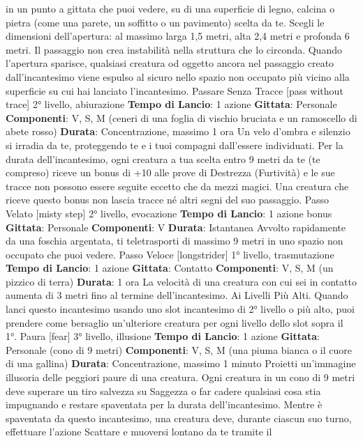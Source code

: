 \begin{multicols}{2}
in un punto a gittata che puoi vedere, su di una
superficie di legno, calcina o pietra (come una parete,
un soffitto o un pavimento) scelta da te. Scegli le
dimensioni dell’apertura: al massimo larga 1,5 metri, 
alta 2,4 metri e profonda 6 metri. Il passaggio non crea
instabilità nella struttura che lo circonda.
Quando l’apertura sparisce, qualsiasi creatura od
oggetto ancora nel passaggio creato dall’incantesimo
viene espulso al sicuro nello spazio non occupato più
vicino alla superficie su cui hai lanciato l’incantesimo.
Passare Senza Tracce
[pass without trace]
2° livello, abiurazione
\textbf{Tempo di Lancio}: 1 azione
\textbf{Gittata}: Personale
\textbf{Componenti}: V, S, M (ceneri di una foglia di vischio
bruciata e un ramoscello di abete rosso)
\textbf{Durata}: Concentrazione, massimo 1 ora
Un velo d’ombra e silenzio si irradia da te, proteggendo
te e i tuoi compagni dall’essere individuati. Per la durata
dell’incantesimo, ogni creatura a tua scelta entro 9 metri
da te (te compreso) riceve un bonus di +10 alle prove di
Destrezza (Furtività) e le sue tracce non possono
essere seguite eccetto che da mezzi magici. Una
creatura che riceve questo bonus non lascia tracce né
altri segni del suo passaggio.
Passo Velato
[misty step]
2° livello, evocazione
\textbf{Tempo di Lancio}: 1 azione bonus
\textbf{Gittata}: Personale
\textbf{Componenti}: V
\textbf{Durata}: Istantanea
Avvolto rapidamente da una foschia argentata, ti
teletrasporti di massimo 9 metri in uno spazio non
occupato che puoi vedere.
Passo Veloce
[longstrider]
1° livello, trasmutazione
\textbf{Tempo di Lancio}: 1 azione
\textbf{Gittata}: Contatto
\textbf{Componenti}: V, S, M (un pizzico di terra)
\textbf{Durata}: 1 ora
La velocità di una creatura con cui sei in contatto
aumenta di 3 metri fino al termine dell’incantesimo.
Ai Livelli Più Alti. Quando lanci questo incantesimo
usando uno slot incantesimo di 2° livello o più alto, puoi
prendere come bersaglio un’ulteriore creatura per ogni
livello dello slot sopra il 1°.
Paura
[fear]
3° livello, illusione
\textbf{Tempo di Lancio}: 1 azione
\textbf{Gittata}: Personale (cono di 9 metri)
\textbf{Componenti}: V, S, M (una piuma bianca o il cuore di
una gallina)
\textbf{Durata}: Concentrazione, massimo 1 minuto
Proietti un’immagine illusoria delle peggiori paure di una
creatura. Ogni creatura in un cono di 9 metri deve
superare un tiro salvezza su Saggezza o far cadere
qualsiasi cosa stia impugnando e restare spaventata
per la durata dell’incantesimo.
Mentre è spaventata da questo incantesimo, una
creatura deve, durante ciascun suo turno, effettuare
l’azione Scattare e muoversi lontano da te tramite il

\end{multicols}
